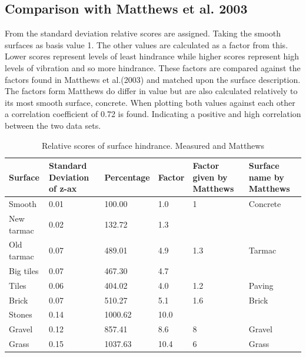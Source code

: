 \clearpage

\subsection{Comparison with Matthews et al. 2003}
From the standard deviation relative scores are assigned. Taking the smooth surfaces as basis value 1. The other values are calculated as a factor from this. Lower scores represent levels of least hindrance while higher scores represent high levels of vibration and so more hindrance. These factors are compared against the factors found in Matthews et al.(2003) and matched upon the surface description. The factors form Matthews do differ in value but are also calculated relatively to its most smooth surface, concrete. When plotting both values against each other a correlation coefficient of 0.72 is found. Indicating a positive and high correlation between the two data sets. 

\begin{table}[hb]
\caption[Relative scores of surface hindrance.]{Relative scores of surface hindrance. Measured and Matthews \label{compare}}
\centering
\begin{tabular}{|p{67.6pt}|p{55.6pt}|p{55.6pt}|p{55.6pt}|p{55.6pt}|p{55.6pt}|}
\hline
Surface & Standard Deviation of z-ax & Percentage & Factor & Factor given by Matthews & Surface name by Matthews \\
\hline
Smooth & 0.01 & 100.00 & 1.0 & 1 & Concrete \\
New tarmac & 0.02 & 132.72 & 1.3 & & \\
Old tarmac & 0.07 & 489.01 & 4.9 & 1.3 & Tarmac \\
Big tiles & 0.07 & 467.30 & 4.7 &  & \\
Tiles & 0.06 & 404.02 & 4.0 & 1.2 & Paving \\
Brick & 0.07 & 510.27 & 5.1 & 1.6 & Brick \\
Stones & 0.14 & 1000.62 & 10.0 & & \\
Gravel & 0.12 & 857.41 & 8.6 & 8 & Gravel \\
Grass & 0.15 & 1037.63 & 10.4 & 6 & Grass \\
\hline 
\end{tabular}
\end{table}

